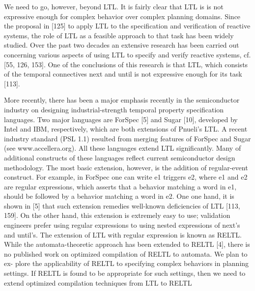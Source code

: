 




We need to go, however, beyond LTL. It is fairly clear that LTL is is not expressive enough for complex behavior over complex planning domains. Since the proposal in [125] to apply LTL to the specification and verification of reactive systems, the role of LTL as a feasible approach to that task has been widely studied. Over the past two decades an extensive research has been carried out concerning various aspects of using LTL to specify and verify reactive systems, cf. [55, 126, 153]. One of the conclusions of this research is that LTL, which consists of the temporal connectives next and until is not expressive enough for its task [113]. 

More recently, there has been a major emphasis recently in the semiconductor industry on designing industrial-strength temporal property specification languages. Two major languages are ForSpec [5] and Sugar [10], developed by Intel and IBM, respectively, which are both extensions of Pnueli’s LTL. A recent industry standard (PSL 1.1) resulted from merging features of ForSpec and Sugar (see www.accellera.org). All these languages extend LTL significantly. Many of additional constructs of these languages reflect current semiconductor design methodology. The most basic extension, however, is the addition of regular-event construct. For example, in ForSpec one can write e1 triggers e2, where e1 and e2 are regular expressions, which asserts that a behavior matching a word in e1, should be followed by a behavior matching a word in e2. One one hand, it is shown in [5] that such extension remedies well-known deficiencies of LTL [113, 159]. On the other hand, this extension is extremely easy to use; validation engineers prefer using regular expressions to using nested expressions of next’s and until’s. The extension of LTL with regular expression is known as RELTL. While the automata-theoretic approach has been extended to RELTL [4], there is no published work on optimized compilation of RELTL to automata. We plan to ex- plore the applicability of RELTL to specifying complex behaviors in planning settings. If RELTL is found to be appropriate for such settings, then we need to extend optimized compilation techniques from LTL to RELTL


